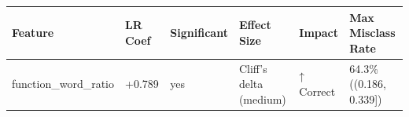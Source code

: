 \begin{tabular}{llllll}
\toprule
Feature & LR Coef & Significant & Effect Size & Impact & Max Misclass Rate \\
\midrule
function\_word\_ratio & +0.789 & yes & Cliff's delta (medium) & ↑ Correct & 64.3\% ((0.186, 0.339]) \\
\bottomrule
\end{tabular}
